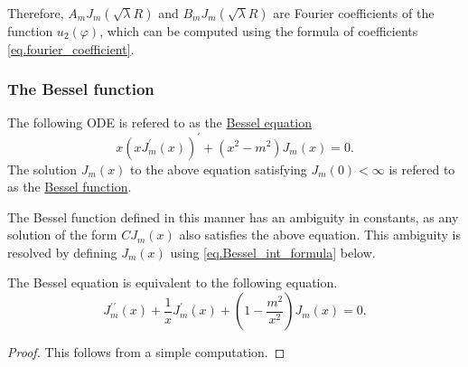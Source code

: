 Therefore, $A_m J_m(\sqrt{\lambda}R)$ and $B_m J_m(\sqrt{\lambda}R)$ are Fourier coefficients of the function $u_2(\varphi)$, which can be computed using the formula of coefficients \eqref{eq.fourier_coefficient}. 

\subsubsection{The Bessel function}

\begin{definition} The following ODE is refered to as the \underline{Bessel equation}
\begin{equation}\label{eq.Bessel_ODE}
    x(x J_m^{\prime}(x))^{\prime} + (x^2 - m^2) J_m(x) = 0.
\end{equation}
The solution $J_m(x)$ to the above equation satisfying $J_m(0) < \infty$ is refered to as the \underline{Bessel function}. 
\end{definition}
\begin{remark}[]
    The Bessel function defined in this manner has an ambiguity in constants, as any solution of the form $C J_m(x)$ also satisfies the above equation. This ambiguity is resolved by defining $J_m(x)$ using \eqref{eq.Bessel_int_formula} below.
\end{remark}

\begin{lemma}[]
The Bessel equation is equivalent to the following equation.
$$
    J_m^{\prime \prime}(x)+\frac{1}{x} J_m^{\prime}(x)+\left(1-\frac{m^2}{x^2}\right) J_m(x)=0 .
$$
\end{lemma}
\begin{proof}
    This follows from a simple computation.
\end{proof}

